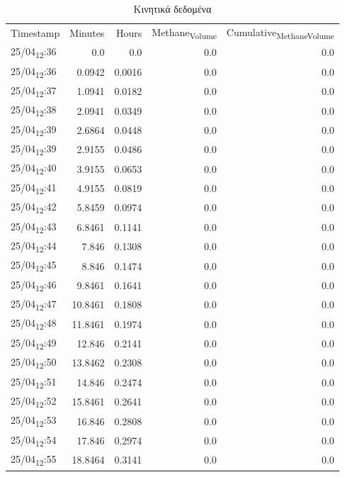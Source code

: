\documentclass[11pt]{article}
\begin{document}
\begin{table}[htbp]
\caption{Κινητικά δεδομένα}
\centering
\begin{tabular}{lrrrr}
Timestamp & Minutes & Hours & Methane\textsubscript{Volume} & Cumulative\textsubscript{Methane}\textsubscript{Volume}\\[0pt]
25/04\textsubscript{12}:36 & 0.0 & 0.0 & 0.0 & 0.0\\[0pt]
25/04\textsubscript{12}:36 & 0.0942 & 0.0016 & 0.0 & 0.0\\[0pt]
25/04\textsubscript{12}:37 & 1.0941 & 0.0182 & 0.0 & 0.0\\[0pt]
25/04\textsubscript{12}:38 & 2.0941 & 0.0349 & 0.0 & 0.0\\[0pt]
25/04\textsubscript{12}:39 & 2.6864 & 0.0448 & 0.0 & 0.0\\[0pt]
25/04\textsubscript{12}:39 & 2.9155 & 0.0486 & 0.0 & 0.0\\[0pt]
25/04\textsubscript{12}:40 & 3.9155 & 0.0653 & 0.0 & 0.0\\[0pt]
25/04\textsubscript{12}:41 & 4.9155 & 0.0819 & 0.0 & 0.0\\[0pt]
25/04\textsubscript{12}:42 & 5.8459 & 0.0974 & 0.0 & 0.0\\[0pt]
25/04\textsubscript{12}:43 & 6.8461 & 0.1141 & 0.0 & 0.0\\[0pt]
25/04\textsubscript{12}:44 & 7.846 & 0.1308 & 0.0 & 0.0\\[0pt]
25/04\textsubscript{12}:45 & 8.846 & 0.1474 & 0.0 & 0.0\\[0pt]
25/04\textsubscript{12}:46 & 9.8461 & 0.1641 & 0.0 & 0.0\\[0pt]
25/04\textsubscript{12}:47 & 10.8461 & 0.1808 & 0.0 & 0.0\\[0pt]
25/04\textsubscript{12}:48 & 11.8461 & 0.1974 & 0.0 & 0.0\\[0pt]
25/04\textsubscript{12}:49 & 12.846 & 0.2141 & 0.0 & 0.0\\[0pt]
25/04\textsubscript{12}:50 & 13.8462 & 0.2308 & 0.0 & 0.0\\[0pt]
25/04\textsubscript{12}:51 & 14.846 & 0.2474 & 0.0 & 0.0\\[0pt]
25/04\textsubscript{12}:52 & 15.8461 & 0.2641 & 0.0 & 0.0\\[0pt]
25/04\textsubscript{12}:53 & 16.846 & 0.2808 & 0.0 & 0.0\\[0pt]
25/04\textsubscript{12}:54 & 17.846 & 0.2974 & 0.0 & 0.0\\[0pt]
25/04\textsubscript{12}:55 & 18.8464 & 0.3141 & 0.0 & 0.0\\[0pt]

\end{tabular}
\end{table}
\end{document}
